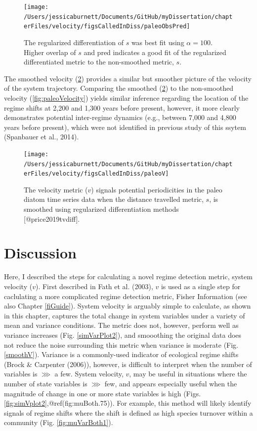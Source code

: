 \documentclass[12pt,twoside,openany]{reedthesis}
\begin{document}
\begin{figure}
\texttt{[image: /Users/jessicaburnett/Documents/GitHub/myDissertation/chapterFiles/velocity/figsCalledInDiss/paleoObsPred]} \caption{The regularized differentiation of $s$ was best fit using $\alpha = 100$. Higher overlap of $s$ and pred indicates a good fit of the regularized differentiated metric to the non-smoothed metric, $s$.}\label{fig:paleoObsPred}
\end{figure}
The smoothed velocity (\ref{fig:paleoV}) provides a similar but smoother picture of the velocity of the system trajectory. Comparing the smoothed (\ref{fig:paleoV}) to the non-smoothed velocity (\ref{fig:paleoVelocity}) yields similar inference regarding the location of the regime shifts at 2,200 and 1,300 years before present, however, it more clearly demonstrates potential inter-regime dynamics (e.g., between 7,000 and 4,800 years before present), which were not identified in previous study of this ssytem (Spanbauer et al., 2014).
\begin{figure}
\texttt{[image: /Users/jessicaburnett/Documents/GitHub/myDissertation/chapterFiles/velocity/figsCalledInDiss/paleoV]} \caption{The velocity metric  ($v$) signals potential periodicities in the paleo diatom time series data when the distance travelled metric, $s$, is smoothed using regularized differentiation methods [@price2019tvdiff].}\label{fig:paleoV}
\end{figure}
\hypertarget{discussion-3}{%
\section{Discussion}\label{discussion-3}}

Here, I described the steps for calculating a novel regime detection metric, system velocity (\(v\)). First described in Fath et al. (2003), \(v\) is used as a single step for caclulating a more complicated regime detection metric, Fisher Information (see also Chapter \ref{fiGuide}). System velocity is arguably simple to calculate, as shown in this chapter, captures the total change in system variables under a variety of mean and variance conditions. The metric does not, however, perform well as variance increases (Fig. \ref{simVarPlot2}), and smooothing the original data does not reduce the noise surrounding this metric when variance is moderate (Fig. \ref{smoothV}). Variance is a commonly-used indicator of ecological regime shifts (Brock \& Carpenter (2006)), however, is difficult to interpret when the number of variables is \(\ggg\) a few. System velocity, \(v\), may be useful in situations where the number of state variables is \(\ggg\) few, and appears especially useful when the magnitude of change in one or more state variables is high (Figs. \ref{fig:simVplot2},@ref(fig:muBoth.75)). For example, this method will likely identify signals of regime shifts where the shift is defined as high species turnover within a community (Fig. \ref{fig:muVarBoth1}).
\end{document}
